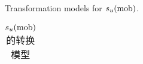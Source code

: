 \begin{table}[!htb]
    \centering
    \scriptsize
    \caption{Transformation models for $s_u(\rm{mob})$.}
    \addtocounter{table}{-1}
    \vspace{-8pt}
    \renewcommand{\tablename}{表}
    \caption{$s_u(\rm{mob})$的转换模型}
    \vspace{4pt}
    \renewcommand{\tablename}{Table}
    \begin{tabularx}{\textwidth}{lll}
        
    \end{tabularx}%
    \label{table:6}%
\end{table}
